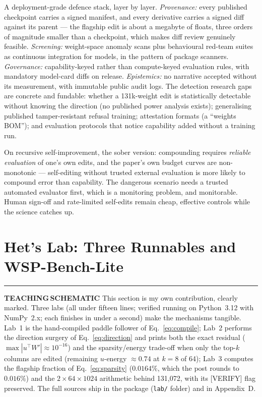 \documentclass[11pt,a4paper]{article}
\newcommand{\bS}{\textcolor{wspamber}{\rule[0.12ex]{1.5mm}{1.5mm}}\;\textcolor{wspamber}{\textbf{TEACHING\,SCHEMATIC}}}
\begin{document}
A deployment-grade defence stack, layer by layer. \emph{Provenance:} every published checkpoint carries a signed manifest, and every derivative carries a signed diff against its parent --- the flagship edit is about a megabyte of floats, three orders of magnitude smaller than a checkpoint, which makes diff review genuinely feasible. \emph{Screening:} weight-space anomaly scans plus behavioural red-team suites as continuous integration for models, in the pattern of package scanners. \emph{Governance:} capability-keyed rather than compute-keyed evaluation rules, with mandatory model-card diffs on release. \emph{Epistemics:} no narrative accepted without its measurement, with immutable public audit logs. The detection research gaps are concrete and fundable: whether a 131k-weight edit is statistically detectable without knowing the direction (no published power analysis exists); generalising published tamper-resistant refusal training; attestation formats (a ``weights BOM''); and evaluation protocols that notice capability added without a training run.

On recursive self-improvement, the sober version: compounding requires \emph{reliable evaluation} of one's own edits, and the paper's own budget curves are non-monotonic --- self-editing without trusted external evaluation is more likely to compound error than capability. The dangerous scenario needs a trusted automated evaluator first, which is a monitoring problem, and monitorable. Human sign-off and rate-limited self-edits remain cheap, effective controls while the science catches up.

\section{Het's Lab: Three Runnables and WSP-Bench-Lite}\label{sec:lab}

\bS\; This section is my own contribution, clearly marked. Three labs (all under fifteen lines; verified running on Python~3.12 with NumPy~2.x; each finishes in under a second) make the mechanisms tangible. Lab~1 is the hand-compiled paddle follower of Eq.~\eqref{eq:compile}; Lab~2 performs the direction surgery of Eq.~\eqref{eq:direction} and prints both the exact residual ($\max |u^{\top} W'| \approx 10^{-16}$) and the sparsity/energy trade-off when only the top-$k$ columns are edited (remaining $u$-energy ${\approx}0.74$ at $k{=}8$ of 64); Lab~3 computes the flagship fraction of Eq.~\eqref{eq:sparsity} ($0.0164\%$, which the post rounds to $0.016\%$) and the $2 \times 64 \times 1024$ arithmetic behind 131{,}072, with its [VERIFY] flag preserved. The full sources ship in the package (\texttt{lab/} folder) and in Appendix~D.
\end{document}
